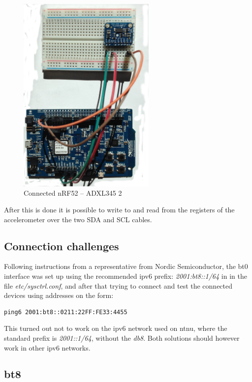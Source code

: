\begin{figure}[ht]
    \centering
    \includegraphics[width=0.6\textwidth]{connectionADXL-nrf3.png}    
    \caption{Connected nRF52 -- ADXL345 2}
    \label{fig:nrf-adxl345}
\end{figure}

After this is done it is possible to write to and read from the registers of the accelerometer over the two SDA and SCL cables. 


\subsection{Connection challenges}

Following instructions from a representative from Nordic Semiconductor, the bt0 interface was set up using the recommended \gls{ipv6} prefix: \textit{2001:bt8::1/64} in in the file \textit{etc/sysctrl.conf}, and after that trying to connect and test the connected devices using addresses on the form: 

\begin{verbatim}
ping6 2001:bt8::0211:22FF:FE33:4455
\end{verbatim}

This turned out not to work on the \gls{ipv6} network used on \gls{ntnu}, where the standard prefix is \textit{2001::1/64}, without the \textit{db8}. Both solutions should however work in other \gls{ipv6} networks. 

\subsection{bt8}

